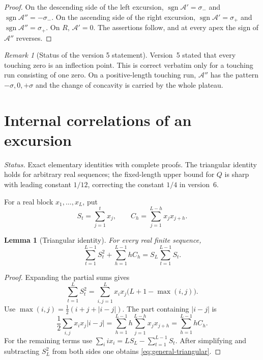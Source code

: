 \documentclass[11pt]{amsart}
\numberwithin{equation}{section}
\theoremstyle{plain}
\newtheorem{lemma}[theorem]{Lemma}
\theoremstyle{definition}
\theoremstyle{remark}
\newtheorem{remark}[theorem]{Remark}
\DeclareMathOperator{\sgn}{sgn}
\newcommand{\Anet}{\mathcal{A}}
\begin{document}
\begin{proof}
On the descending side of the left excursion,
$\sgn\Anet'=\sigma_-$ and $\sgn\Anet''=-\sigma_-$.  On the ascending side
of the right excursion, $\sgn\Anet'=\sigma_+$ and
$\sgn\Anet''=\sigma_+$.  On $R$, $\Anet'=0$.  The assertions follow, and at
every apex the sign of $\Anet''$ reverses.
\end{proof}

\begin{remark}[Status of the version 5 statement]
\label{rem:critical_v5}
Version~5 stated that every touching zero is an inflection point.  This is
correct verbatim only for a touching run consisting of one zero.  On a
positive-length touching run, $\Anet''$ has the pattern
$-\sigma,0,+\sigma$ and the change of concavity is carried by the whole
plateau.
\end{remark}

\section{Internal correlations of an excursion}
\label{sec:internal_corr}

\noindent\emph{Status.} Exact elementary identities with complete proofs.
The triangular identity holds for arbitrary real sequences; the fixed-length
upper bound for $Q$ is sharp with leading constant $1/12$, correcting the
constant $1/4$ in version~6.

For a real block $x_1,\dots,x_L$, put
\begin{equation}
\label{eq:block_def}
S_t=\sum_{j=1}^t x_j,\qquad
C_h=\sum_{j=1}^{L-h}x_jx_{j+h}.
\end{equation}

\begin{lemma}[Triangular identity]
\label{lem:triangular-corr}
For every real finite sequence,
\begin{equation}
\label{eq:general-triangular}
\sum_{t=1}^{L-1}S_t^2+\sum_{h=1}^{L-1}hC_h
=S_L\sum_{t=1}^{L-1}S_t.
\end{equation}
\end{lemma}

\begin{proof}
Expanding the partial sums gives
\[
\sum_{t=1}^{L}S_t^2
=\sum_{i,j=1}^{L}x_ix_j\bigl(L+1-\max(i,j)\bigr).
\]
Use
$\max(i,j)=\tfrac12(i+j+|i-j|)$.  The part containing $|i-j|$ is
\[
\frac12\sum_{i,j}x_ix_j|i-j|
=\sum_{h=1}^{L-1}h\sum_{j=1}^{L-h}x_jx_{j+h}
=\sum_{h=1}^{L-1}hC_h.
\]
For the remaining terms use
$\sum_i i x_i=LS_L-\sum_{t=1}^{L-1}S_t$.  After simplifying and subtracting
$S_L^2$ from both sides one obtains \eqref{eq:general-triangular}.
\end{proof}
\end{document}
